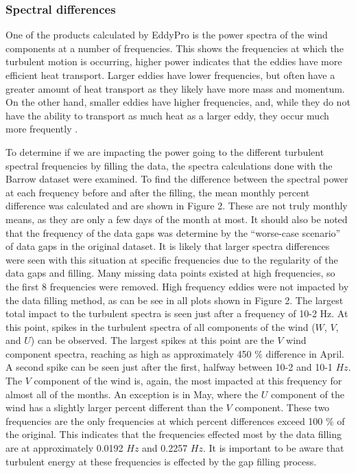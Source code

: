  \subsubsection{Spectral differences}
One of the products calculated by EddyPro is the power spectra of the wind components at a number of frequencies. This shows the frequencies at which the turbulent motion is occurring, higher power indicates that the eddies have more efficient heat transport. Larger eddies have lower frequencies, but often have a greater amount of heat transport as they likely have more mass and momentum. On the other hand, smaller eddies have higher frequencies, and, while they do not have the ability to transport as much heat as a larger eddy, they occur much more frequently \citep{cohen:2015}. 

To determine if we are impacting the power going to the different turbulent spectral frequencies by filling the data, the spectra calculations done with the Barrow dataset were examined. To find the difference between the spectral power at each frequency before and after the filling, the mean monthly percent difference was calculated and are shown in Figure 2. These are not truly monthly means, as they are only a few days of the month at most. It should also be noted that the frequency of the data gaps was determine by the “worse-case scenario” of data gaps in the original dataset. It is likely that larger spectra differences were seen with this situation at specific frequencies due to the regularity of the data gaps and filling. 
Many missing data points existed at high frequencies, so the first 8 frequencies were removed. High frequency eddies were not impacted by the data filling method, as can be see in all plots shown in Figure 2. The largest total impact to the turbulent spectra is seen just after a frequency of 10-2 Hz. At this point, spikes in the turbulent spectra of all components of the wind ($W$, $V$, and $U$) can be observed. The largest spikes at this point are the $V$ wind component spectra, reaching as high as approximately 450 $\%$ difference in April. A second spike can be seen just after the first, halfway between 10-2 and 10-1 $Hz$. The $V$ component of the wind is, again, the most impacted at this frequency for almost all of the months. An exception is in May, where the $U$ component of the wind has a slightly larger percent different than the $V$ component. These two frequencies are the only frequencies at which percent differences exceed 100 $\%$ of the original. This indicates that the frequencies effected most by the data filling are at approximately 0.0192 $Hz$ and 0.2257 $Hz$. It is important to be aware that turbulent energy at these frequencies is effected by the gap filling process.
 
